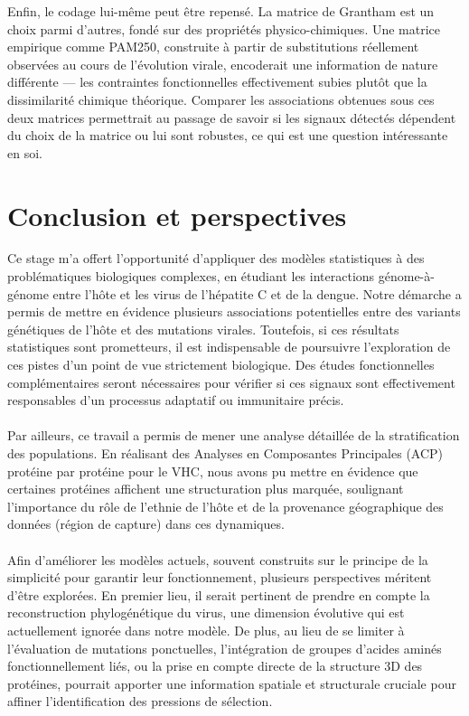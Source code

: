 \documentclass[11pt,a4paper]{article}
\begin{document}
Enfin, le codage lui-même peut être repensé. La matrice de Grantham est un choix parmi d'autres,
fondé sur des propriétés physico-chimiques. Une matrice empirique comme PAM250, construite à
partir de substitutions réellement observées au cours de l'évolution virale, encoderait une information
de nature différente — les contraintes fonctionnelles effectivement subies plutôt que la
dissimilarité chimique théorique. Comparer les associations obtenues sous ces deux matrices
permettrait au passage de savoir si les signaux détectés dépendent du choix de la matrice ou lui
sont robustes, ce qui est une question intéressante en soi.




\newpage
\section{Conclusion et perspectives}
Ce stage m'a offert l'opportunité d'appliquer des modèles statistiques à des problématiques biologiques complexes, en étudiant les interactions génome-à-génome entre l'hôte et les virus de l'hépatite C et de la dengue. Notre démarche a permis de mettre en évidence plusieurs associations potentielles entre des variants génétiques de l'hôte et des mutations virales. Toutefois, si ces résultats statistiques sont prometteurs, il est indispensable de poursuivre l'exploration de ces pistes d'un point de vue strictement biologique. Des études fonctionnelles complémentaires seront nécessaires pour vérifier si ces signaux sont effectivement responsables d'un processus adaptatif ou immunitaire précis.
\\
\\
Par ailleurs, ce travail a permis de mener une analyse détaillée de la stratification des populations. En réalisant des Analyses en Composantes Principales (ACP) protéine par protéine pour le VHC, nous avons pu mettre en évidence que certaines protéines affichent une structuration plus marquée, soulignant l'importance du rôle de l'ethnie de l'hôte et de la provenance géographique des données (région de capture) dans ces dynamiques.
\\
\\
Afin d'améliorer les modèles actuels, souvent construits sur le principe de la simplicité pour garantir leur fonctionnement, plusieurs perspectives méritent d'être explorées. En premier lieu, il serait pertinent de prendre en compte la reconstruction phylogénétique du virus, une dimension évolutive qui est actuellement ignorée dans notre modèle. De plus, au lieu de se limiter à l'évaluation de mutations ponctuelles, l'intégration de groupes d'acides aminés fonctionnellement liés, ou la prise en compte directe de la structure 3D des protéines, pourrait apporter une information spatiale et structurale cruciale pour affiner l'identification des pressions de sélection.
\end{document}

